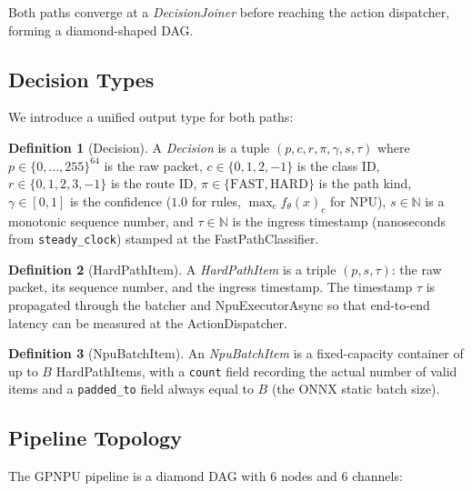 \documentclass[11pt,a4paper,twoside]{article}
\theoremstyle{definition}
\newtheorem{definition}{Definition}[section]
\theoremstyle{remark}
\begin{document}
\noindent Both paths converge at a \textit{DecisionJoiner} before reaching the action dispatcher, forming a diamond-shaped DAG.

\subsection{Decision Types}

We introduce a unified output type for both paths:

\begin{definition}[Decision]
A \emph{Decision} is a tuple $(p, c, r, \pi, \gamma, s, \tau)$ where $p \in \{0,\ldots,255\}^{64}$ is the raw packet, $c \in \{0,1,2,-1\}$ is the class ID, $r \in \{0,1,2,3,-1\}$ is the route ID, $\pi \in \{\text{FAST}, \text{HARD}\}$ is the path kind, $\gamma \in [0,1]$ is the confidence ($1.0$ for rules, $\max_c f_\theta(x)_c$ for NPU), $s \in \mathbb{N}$ is a monotonic sequence number, and $\tau \in \mathbb{N}$ is the ingress timestamp (nanoseconds from \texttt{steady\_clock}) stamped at the FastPathClassifier.
\end{definition}

\begin{definition}[HardPathItem]
A \emph{HardPathItem} is a triple $(p, s, \tau)$: the raw packet, its sequence number, and the ingress timestamp. The timestamp $\tau$ is propagated through the batcher and NpuExecutorAsync so that end-to-end latency can be measured at the ActionDispatcher.
\end{definition}

\begin{definition}[NpuBatchItem]
An \emph{NpuBatchItem} is a fixed-capacity container of up to $B$ HardPathItems, with a \texttt{count} field recording the actual number of valid items and a \texttt{padded\_to} field always equal to $B$ (the ONNX static batch size).
\end{definition}

\subsection{Pipeline Topology}

The GPNPU pipeline is a diamond DAG with 6 nodes and 6 channels:
\end{document}
